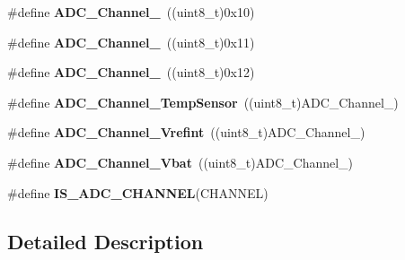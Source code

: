 \begin{DoxyCompactItemize}
\item 
\hypertarget{group___a_d_c__channels_ga52fb09ae9a0333a0e071da106466c659}{\#define {\bfseries A\-D\-C\-\_\-\-Channel\-\_}~((uint8\-\_\-t)0x10)}\label{group___a_d_c__channels_ga52fb09ae9a0333a0e071da106466c659}

\item 
\hypertarget{group___a_d_c__channels_ga58cdfe3a5625f198116d163b09698cea}{\#define {\bfseries A\-D\-C\-\_\-\-Channel\-\_}~((uint8\-\_\-t)0x11)}\label{group___a_d_c__channels_ga58cdfe3a5625f198116d163b09698cea}

\item 
\hypertarget{group___a_d_c__channels_gacc9277b9f14b55c5dff2f493dc5e7797}{\#define {\bfseries A\-D\-C\-\_\-\-Channel\-\_}~((uint8\-\_\-t)0x12)}\label{group___a_d_c__channels_gacc9277b9f14b55c5dff2f493dc5e7797}

\item 
\hypertarget{group___a_d_c__channels_ga1efc096b8d4a8d15c4a7d91f5c03c6c7}{\#define {\bfseries A\-D\-C\-\_\-\-Channel\-\_\-\-Temp\-Sensor}~((uint8\-\_\-t)A\-D\-C\-\_\-\-Channel\-\_)}\label{group___a_d_c__channels_ga1efc096b8d4a8d15c4a7d91f5c03c6c7}

\item 
\hypertarget{group___a_d_c__channels_ga5d48ded5138e6f1efe3a7634eff4d125}{\#define {\bfseries A\-D\-C\-\_\-\-Channel\-\_\-\-Vrefint}~((uint8\-\_\-t)A\-D\-C\-\_\-\-Channel\-\_)}\label{group___a_d_c__channels_ga5d48ded5138e6f1efe3a7634eff4d125}

\item 
\hypertarget{group___a_d_c__channels_gae86cee19a99a31d5ed3f95f64d81301a}{\#define {\bfseries A\-D\-C\-\_\-\-Channel\-\_\-\-Vbat}~((uint8\-\_\-t)A\-D\-C\-\_\-\-Channel\-\_)}\label{group___a_d_c__channels_gae86cee19a99a31d5ed3f95f64d81301a}

\item 
\#define {\bfseries I\-S\-\_\-\-A\-D\-C\-\_\-\-C\-H\-A\-N\-N\-E\-L}(C\-H\-A\-N\-N\-E\-L)
\end{DoxyCompactItemize}


\subsection{Detailed Description}


